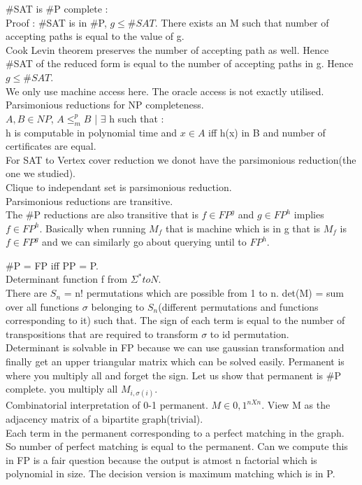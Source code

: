 \documentclass[solution,addpoints,12pt]{exam}
\begin{document}
\#SAT is \#P complete :\\
Proof : \#SAT is in \#P, $g \le \#SAT$.
There exists an M such that number of accepting paths is equal to the value of g.\\
Cook Levin theorem preserves the number of accepting path as well. Hence \#SAT of the
reduced form is equal to the number of accepting paths in g. Hence $g \le \#SAT$.\\
We only use machine access here. The oracle access is not exactly utilised.\\
Parsimonious reductions for NP completeness.\\
$A, B \in NP$, $ A \le_{m}^{p} B$ | $\exists$ h such that :\\
h is computable in polynomial time and $x \in A$ iff h(x) in B and number of
certificates are equal.\\
For SAT to Vertex cover reduction we donot have the parsimonious reduction(the one we
studied).\\
Clique to independant set is parsimonious reduction.\\
Parsimonious reductions are transitive.\\
The \#P reductions are also transitive that is $f \in {FP}^g$ and $g \in {FP}^h$
implies $f \in {FP}^h$.
Basically when running $M_f$ that is machine which is in g that is $M_f$ is $f \in {FP}
^g$ and we can similarly go about querying until to ${FP}^h$.

\#P = FP iff PP = P.\\
Determinant function f from $\Sigma^* to N$.\\
There are $S_n$ = n! permutations which are possible from 1 to n.
det(M) = sum over all functions $\sigma$ belonging to $S_n$(different permutations and
functions corresponding to it) such that.
The sign of each term is equal to the number of transpositions
that are required to transform $\sigma$ to id permutation.\\
Determinant is solvable in FP because we can use gaussian transformation
and finally get an upper triangular matrix which can be solved easily.
Permanent is where you multiply all and forget the sign.
Let us show that permanent is \#P complete.
you multiply all $M_{i, \sigma(i)}$.\\

Combinatorial interpretation of 0-1 permanent. $M \in {0, 1}^{n X n}$.
View M as the adjacency matrix of a bipartite graph(trivial).\\
Each term in the permanent corresponding to a perfect matching in the graph.
So number of perfect matching is equal to the permanent. Can we compute this
in FP is a fair question because the output is atmost n factorial which
is polynomial in size. The decision version is maximum matching which is in P.\\
\end{document}
